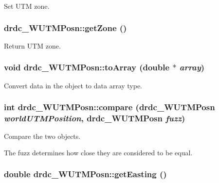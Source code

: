 Set UTM zone. 

\hypertarget{classdrdc__WUTMPosn_13fa9fd7ca91fc24952f52d41339a2cb}{
\subsubsection[getZone]{ drdc\_\-WUTMPosn::getZone ()}}
\label{classdrdc__WUTMPosn_13fa9fd7ca91fc24952f52d41339a2cb}


Return UTM zone. 

\hypertarget{classdrdc__WUTMPosn_568892ce7a76ddbc19e3d627a977261f}{
\subsubsection[toArray]{\setlength{\rightskip}{0pt plus 5cm}void drdc\_\-WUTMPosn::toArray (double $\ast$ {\em array})}}
\label{classdrdc__WUTMPosn_568892ce7a76ddbc19e3d627a977261f}


Convert data in the object to data array type. 

\hypertarget{classdrdc__WUTMPosn_ad6103831648f11947798527a8df34d5}{
\subsubsection[compare]{\setlength{\rightskip}{0pt plus 5cm}int drdc\_\-WUTMPosn::compare ({\bf drdc\_\-WUTMPosn} {\em worldUTMPosition}, \/  {\bf drdc\_\-WUTMPosn} {\em fuzz})}}
\label{classdrdc__WUTMPosn_ad6103831648f11947798527a8df34d5}


Compare the two objects. 

The fuzz determines how close they are considered to be equal. \hypertarget{classdrdc__WUTMPosn_3e4c6d4abbc6efa724733b795826c766}{
\subsubsection[getEasting]{\setlength{\rightskip}{0pt plus 5cm}double drdc\_\-WUTMPosn::getEasting ()}}
\label{classdrdc__WUTMPosn_3e4c6d4abbc6efa724733b795826c766}


